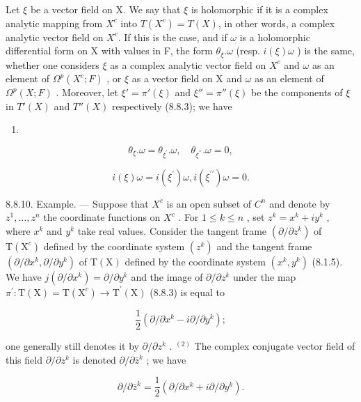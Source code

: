 Let \(\xi\) be a vector field on X. We say that \(\xi\) is holomorphic if it is a complex analytic mapping from \(X^c\) into \(T(X^c) = T(X)\), in other words, a complex analytic vector field on \(X^c\). If this is the case, and if \(\omega\) is a holomorphic differential form on X with values in F, the form \(\theta_{\xi}.\omega\) (resp. \(i(\xi)\omega\) ) is the same, whether one considers \(\xi\) as a complex analytic vector field on \(X^c\) and \(\omega\) as an element of \(\Omega^p(X^c; F)\) , or \(\xi\) as a vector field on X and \(\omega\) as an element of \(\Omega^p(X; F)\) . Moreover, let \(\xi' = \pi'(\xi)\) and \(\xi'' = \pi''(\xi)\) be the components of \(\xi\) in \(T'(X)\) and \(T''(X)\) respectively (8.8.3); we have

\begin{enumerate}
\def\labelenumi{(\arabic{enumi})}
\setcounter{enumi}{6}
\tightlist
\item
\end{enumerate}
\[
\theta_ {\xi}. \omega = \theta_ {\xi^ {\prime}}. \omega , \quad \theta_ {\xi^ {\prime \prime}}. \omega = 0,\tag{7}
\]

\[
i (\xi) \omega = i (\xi^ {\prime}) \omega , i (\xi^ {\prime \prime}) \omega = 0.\tag{8}
\]

8.8.10. Example. --- Suppose that \(X^{c}\) is an open subset of \(C^{n}\) and denote by \(z^{1},\ldots,z^{n}\) the coordinate functions on \(X^{c}\) . For \(1\leqslant k\leqslant n\) , set \(z^{k}=x^{k}+iy^{k}\) , where \(x^{k}\) and \(y^{k}\) take real values. Consider the tangent frame \((\partial/\partial z^{k})\) of \(\mathrm{T}(\mathrm{X}^{c})\) defined by the coordinate system \((z^{k})\) and the tangent frame \((\partial/\partial x^{k},\partial/\partial y^{k})\) of \(\mathrm{T}(\mathrm{X})\) defined by the coordinate system \((x^{k},y^{k})\) (8.1.5). We have \(j(\partial/\partial x^{k})=\partial/\partial y^{k}\) and the image of \(\partial/\partial z^{k}\) under the map \(\pi^{\prime}\colon\mathrm{T}(\mathrm{X})=\mathrm{T}(\mathrm{X}^{c})\to\mathrm{T}^{\prime}(\mathrm{X})\) (8.8.3) is equal to

\[
\frac {1}{2} (\partial / \partial x ^ {k} - i \partial / \partial y ^ {k});
\]

one generally still denotes it by \(\partial/\partial z^{k}\) . \(^{(2)}\) The complex conjugate vector field of this field \(\partial/\partial z^{k}\) is denoted \(\partial/\partial\bar{z}^{k}\) ; we have

\[
\partial / \partial \bar {z} ^ {k} = \frac {1}{2} (\partial / \partial x ^ {k} + i \partial / \partial y ^ {k}).\tag{9}
\]

